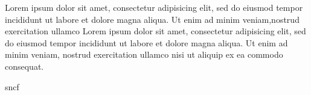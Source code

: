 \documentclass{book}
\begin{document}
\makeatletter


\begin{pages}


\begin{Leftside}
\beginnumbering
\pstart
\begin{ledgroup}
{

Lorem ipsum dolor sit amet, consectetur adipisicing elit, sed do eiusmod tempor incididunt ut labore et dolore magna aliqua. Ut enim ad minim veniam,nostrud exercitation ullamco  
Lorem ipsum dolor sit amet, consectetur adipisicing elit, sed do eiusmod tempor incididunt ut labore et dolore magna aliqua. Ut enim ad minim veniam, nostrud exercitation ullamco  nisi ut aliquip ex ea commodo consequat.}
\end{ledgroup}
\pend

\pstart
sncf\skipnumbering
\pend
\pstart
\begin{ledgroup}


\end{ledgroup}
\end{Leftside}
\end{pages}
\end{document}
